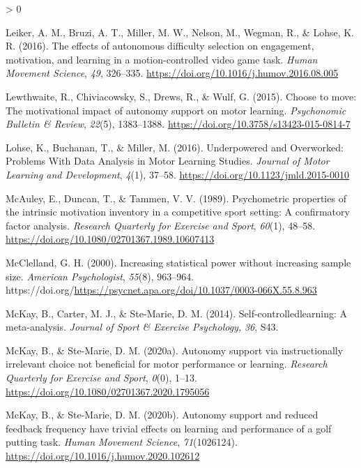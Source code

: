 \documentclass[
  english,
  jou]{apa7}
\newlength{\cslhangindent}
\newenvironment{CSLReferences}[2] %
 {%
  \setlength{\parindent}{0pt}
  \ifodd #1 \everypar{\setlength{\hangindent}{\cslhangindent}}\ignorespaces\fi
  \ifnum #2 > 0
  \setlength{\parskip}{#2\baselineskip}
  \fi
 }%
 {}
\begin{document}
\begin{CSLReferences}{1}{0}
\leavevmode\hypertarget{ref-leiker2016}{}%
Leiker, A. M., Bruzi, A. T., Miller, M. W., Nelson, M., Wegman, R., \& Lohse, K. R. (2016). The effects of autonomous difficulty selection on engagement, motivation, and learning in a motion-controlled video game task. \emph{Human Movement Science}, \emph{49}, 326--335. \url{https://doi.org/10.1016/j.humov.2016.08.005}

\leavevmode\hypertarget{ref-lewthwaite2015}{}%
Lewthwaite, R., Chiviacowsky, S., Drews, R., \& Wulf, G. (2015). Choose to move: The motivational impact of autonomy support on motor learning. \emph{Psychonomic Bulletin \& Review}, \emph{22}(5), 1383--1388. \url{https://doi.org/10.3758/s13423-015-0814-7}

\leavevmode\hypertarget{ref-lohse2016}{}%
Lohse, K., Buchanan, T., \& Miller, M. (2016). Underpowered and Overworked: Problems With Data Analysis in Motor Learning Studies. \emph{Journal of Motor Learning and Development}, \emph{4}(1), 37--58. \url{https://doi.org/10.1123/jmld.2015-0010}

\leavevmode\hypertarget{ref-mcauley1989}{}%
McAuley, E., Duncan, T., \& Tammen, V. V. (1989). Psychometric properties of the intrinsic motivation inventory in a competitive sport setting: A confirmatory factor analysis. \emph{Research Quarterly for Exercise and Sport}, \emph{60}(1), 48--58. \url{https://doi.org/10.1080/02701367.1989.10607413}

\leavevmode\hypertarget{ref-mcclelland2000}{}%
McClelland, G. H. (2000). Increasing statistical power without increasing sample size. \emph{American Psychologist}, \emph{55}(8), 963--964. https://doi.org/\url{https://psycnet.apa.org/doi/10.1037/0003-066X.55.8.963}

\leavevmode\hypertarget{ref-mckay2014}{}%
McKay, B., Carter, M. J., \& Ste-Marie, D. M. (2014). Self-controlledlearning: A meta-analysis. \emph{Journal of Sport \& Exercise Psychology,} \emph{36}, S43.

\leavevmode\hypertarget{ref-mckay2020a}{}%
McKay, B., \& Ste-Marie, D. M. (2020a). Autonomy support via instructionally irrelevant choice not beneficial for motor performance or learning. \emph{Research Quarterly for Exercise and Sport}, \emph{0}(0), 1--13. \url{https://doi.org/10.1080/02701367.2020.1795056}

\leavevmode\hypertarget{ref-mckay2020b}{}%
McKay, B., \& Ste-Marie, D. M. (2020b). Autonomy support and reduced feedback frequency have trivial effects on learning and performance of a golf putting task. \emph{Human Movement Science}, \emph{71}(1026124). \url{https://doi.org/10.1016/j.humov.2020.102612}


\end{CSLReferences}
\end{document}
